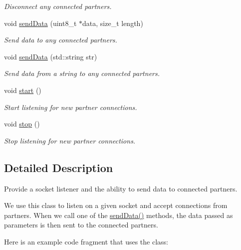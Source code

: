\begin{DoxyCompactItemize}
\begin{DoxyCompactList}\small\item\em Disconnect any connected partners. \end{DoxyCompactList}\item 
void \hyperlink{class_sock_serv_a3e4e4cc30becc9440573c3285e8004d2}{send\+Data} (uint8\+\_\+t $\ast$data, size\+\_\+t length)
\begin{DoxyCompactList}\small\item\em Send data to any connected partners. \end{DoxyCompactList}\item 
void \hyperlink{class_sock_serv_ac50c88830b1b4a3e75b8fbd82799b08d}{send\+Data} (std\+::string str)
\begin{DoxyCompactList}\small\item\em Send data from a string to any connected partners. \end{DoxyCompactList}\item 
void \hyperlink{class_sock_serv_abbfb5d8eba2ef0a47fa0aa981a43f6dc}{start} ()
\begin{DoxyCompactList}\small\item\em Start listening for new partner connections. \end{DoxyCompactList}\item 
void \hyperlink{class_sock_serv_a4d6d90089cd108ba10e481e4aca274f4}{stop} ()\hypertarget{class_sock_serv_a4d6d90089cd108ba10e481e4aca274f4}{}\label{class_sock_serv_a4d6d90089cd108ba10e481e4aca274f4}

\begin{DoxyCompactList}\small\item\em Stop listening for new partner connections. \end{DoxyCompactList}\end{DoxyCompactItemize}


\subsection{Detailed Description}
Provide a socket listener and the ability to send data to connected partners. 

We use this class to listen on a given socket and accept connections from partners. When we call one of the \hyperlink{class_sock_serv_a3e4e4cc30becc9440573c3285e8004d2}{send\+Data()} methods, the data passed as parameters is then sent to the connected partners.

Here is an example code fragment that uses the class\+:


